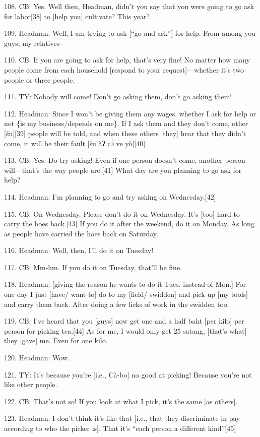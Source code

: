 108. CB: Yes. Well then, Headman, didn't you say that you were going to go ask
for labor[38] to [help you] cultivate?  This year?

109. Headman: Well, I am trying to ask [``go and ask''] for help.  From among you
guys, my relatives---

110. CB: If you are going to ask for help, that's very fine!  No matter how many
people come from each household [respond to your request]---whether it's two people
or three people.

111. TY: Nobody will come!  Don't go asking them, don't go asking them!

112. Headman: Since I won't be giving them any wages, whether I ask for help or
not \{is my business/depends on me\}.  If I ask them and they don't come, other
[šu][39] people will be told, and when these others [they] hear that they didn't
come, it will be their fault [šu àʔ cɔ̀ ve yò][40]

113. CB: Yes.  Do try asking! Even if one person doesn't come, another person will---that's
the way people are.[41]  What day are you planning to go ask for help?

114. Headman: I'm planning to go and try asking on Wednesday.[42]

115. CB: On Wednesday.  Please don't do it on Wednesday.  It's [too] hard to carry
the hoes back.[43]  If you do it after the weekend, do it on Monday.  As long as
people have carried the hoes back on Saturday.

116. Headman: Well, then, I'll do it on Tuesday!

117. CB: Mm-hm.  If you do it on Tuesday, that'll be fine.

118. Headman: [giving the reason he wants to do it Tues. instead of Mon.] For one
day I just [have/ want to] do to my [field/ swidden] and pick up [my tools] and
carry them back.  After doing a few licks of work in the swidden too.

119. CB: I've heard that you [guys] now get one and a half baht [per kilo] per
person for picking tea.[44]  As for me, I would only get 25 satang, [that's what]
they [gave] me.  Even for one kilo.

120. Headman: Wow.

121. TY: It's because you're [i.e., Cà-bo] no good at picking!  Because you're
not like other people.

122. CB: That's not so!  If you look at what I pick, it's the same [as others].

123. Headman: I don't think it's like that [i.e., that they discriminate in pay
according to who the picker is].  That it's ``each person a different kind''\.[45]

